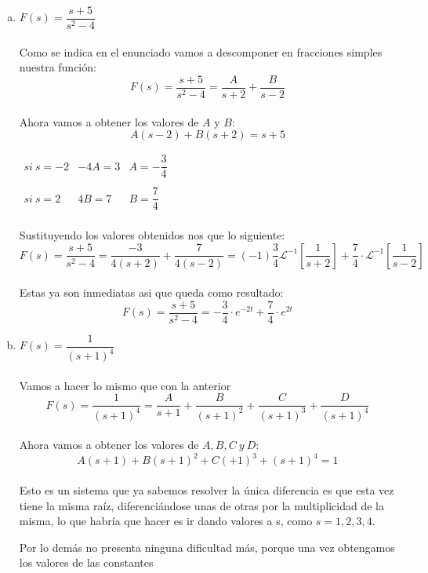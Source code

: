 \documentclass[11pt]{article}
\def\Laplace#1{\mathscr{L}}%
\begin{document}
\begin{enumerate}[a)]
\item $F(s)=\dfrac{s+5}{s^2-4}$
\\ \\ Como se indica en el enunciado vamos a descomponer en fracciones simples nuestra función:
$$F(s)=\dfrac{s+5}{s^2-4}=\dfrac{A}{s+2}+\dfrac{B}{s-2}$$
\\ Ahora vamos a obtener los valores de $A$ y $B$:
$$A(s-2)+B(s+2)=s+5$$
\begin{center}
$\begin{array}{lcl}
	si \ s=-2 & -4A=3 & A= - \dfrac{3}{4} \\ \\
	si \ s=2 & 4B=7 & B= \dfrac{7}{4} \\
\end{array}$
\end{center}
Sustituyendo los valores obtenidos nos que lo siguiente:
$$F(s)=\dfrac{s+5}{s^2-4}=\dfrac{-3}{4(s+2)}+\dfrac{7}{4(s-2)}= (-1)\dfrac{3}{4}\Laplace[^{-1}\left[\dfrac{1}{s+2}\right]+ \dfrac{7}{4}\cdot\Laplace[^{-1}\left[\dfrac{1}{s-2}\right]$$
\\ Estas ya son inmediatas asi que queda como resultado:
$$F(s)=\dfrac{s+5}{s^2-4}=-\dfrac{3}{4}\cdot e^{-2t}+\dfrac{7}{4}\cdot e^{2t}$$
\item $F(s)= \dfrac{1}{(s+1)^4}$ \\ \\
Vamos a hacer lo mismo que con la anterior
$$F(s)= \dfrac{1}{(s+1)^4}= \dfrac{A}{s+1}+\dfrac{B}{(s+1)^2}+\dfrac{C}{(s+1)^3}+\dfrac{D}{(s+1)^4}$$
\\ Ahora vamos a obtener los valores de $A,B,C \ y \ D$:
$$A(s+1)+B(s+1)^2+C(+1)^3+(s+1)^4=1$$ \\
Esto es un sistema que ya sabemos resolver la única diferencia es que esta vez tiene la misma raíz, diferenciándose unas de otras por la multiplicidad de la misma, lo que habría que hacer es ir dando valores a s, como  $s=1,2,3,4.$

Por lo demás no presenta ninguna dificultad más, porque una vez obtengamos los valores de las constantes

\end{enumerate}
\end{document}
